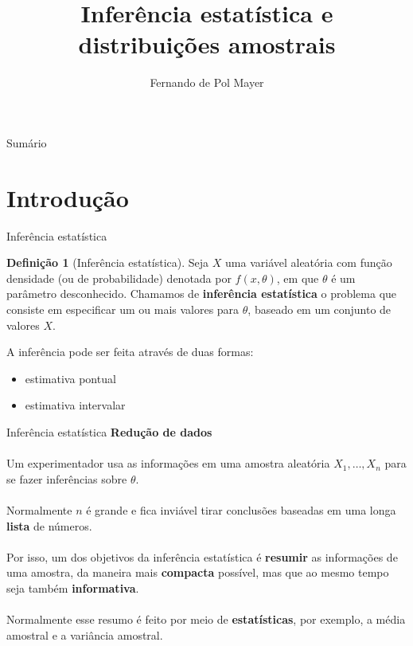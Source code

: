 \documentclass[10pt]{beamer}\usepackage[]{graphicx}\usepackage[]{color}
\title{Inferência estatística e distribuições amostrais}
\author[]{Fernando de Pol Mayer}
\institute[UFPR]{Laboratório de Estatística e Geoinformação (LEG) \\
  Departamento de Estatística (DEST) \\
  Universidade Federal do Paraná (UFPR)}
\date{}
\theoremstyle{definition}
\newtheorem*{mydef}{Definição}
\begin{document}
\begin{frame}
\maketitle
\end{frame}

\begin{frame}{Sumário}
\tableofcontents
\end{frame}

\section[Introdução]{Introdução}

\begin{frame}{Inferência estatística}
\begin{mydef}[Inferência estatística]
  Seja $X$ uma variável aleatória com função densidade (ou de
  probabilidade) denotada por $f(x,\theta)$, em que $\theta$ é um
  parâmetro desconhecido. Chamamos de \textbf{inferência estatística} o
  problema que consiste em especificar um ou mais valores para $\theta$,
  baseado em um conjunto de valores $X$.
  \end{mydef}
  \vspace{1em}
  A inferência pode ser feita através de duas formas:
  \begin{itemize}
  \item estimativa pontual
  \item estimativa intervalar
  \end{itemize}
\end{frame}

\begin{frame}{Inferência estatística}
  \textbf{Redução de dados} \\~\\

  Um experimentador usa as informações em uma amostra aleatória $X_1,
  \ldots, X_n$ para se fazer inferências sobre $\theta$. \\~\\
  Normalmente $n$ é grande e fica inviável tirar conclusões baseadas em
  uma longa \textbf{lista} de números. \\~\\
  Por isso, um dos objetivos da inferência estatística é \textbf{resumir} as
  informações de uma amostra, da maneira mais \textbf{compacta}
  possível, mas que ao mesmo tempo seja também
  \textbf{informativa}. \\~\\
  Normalmente esse resumo é feito por meio de \textbf{estatísticas}, por exemplo,
  a média amostral e a variância amostral.
\end{frame}
\end{document}

